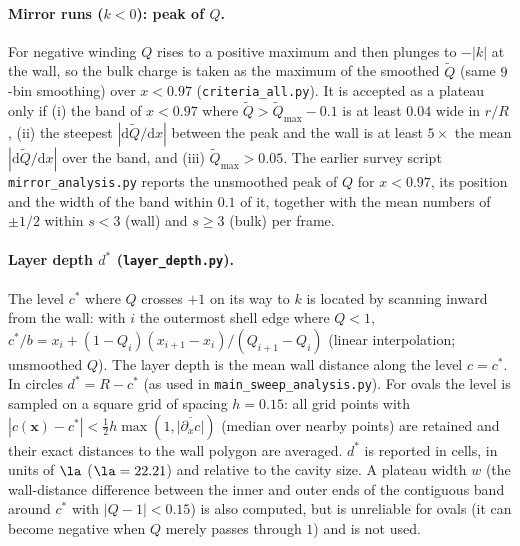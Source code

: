 \paragraph{Mirror runs ($k<0$): peak of $Q$.}
For negative winding $Q$ rises to a positive maximum and then plunges to $-|k|$ at the wall, so the
bulk charge is taken as the maximum of the smoothed $\tilde Q$ (same $9$-bin smoothing) over
$x<0.97$ (\texttt{criteria\_all.py}). It is accepted as a plateau only if (i) the band of $x<0.97$
where $\tilde Q>\tilde Q_{\max}-0.1$ is at least $0.04$ wide in $r/R$, (ii) the steepest
$|\mathrm{d}\tilde Q/\mathrm{d}x|$ between the peak and the wall is at least $5\times$ the mean
$|\mathrm{d}\tilde Q/\mathrm{d}x|$ over the band, and (iii) $\tilde Q_{\max}>0.05$. The earlier survey
script \texttt{mirror\_analysis.py} reports the unsmoothed peak of $Q$ for $x<0.97$, its position and
the width of the band within $0.1$ of it, together with the mean numbers of $\pm1/2$ within $s<3$
(wall) and $s\ge3$ (bulk) per frame.

\paragraph{Layer depth $d^*$ (\texttt{layer\_depth.py}).}
\label{sec:methods-dstar}
The level $c^*$ where $Q$ crosses $+1$ on its way to $k$ is located by scanning inward from the
wall: with $i$ the outermost shell edge where $Q<1$,
$c^*/b = x_i + (1-Q_i)(x_{i+1}-x_i)/(Q_{i+1}-Q_i)$ (linear interpolation; unsmoothed $Q$).
The layer depth is the mean wall distance along the level $c=c^*$. In circles $d^*=R-c^*$
(as used in \texttt{main\_sweep\_analysis.py}). For ovals the level is sampled on a square grid of
spacing $h=0.15$: all grid points with $|c(\mathbf{x})-c^*|<\tfrac12 h\max(1,\overline{|\partial_x c|})$
(median over nearby points) are retained and their exact distances to the wall polygon are averaged.
$d^*$ is reported in cells, in units of $\la$ ($\la=22.21$) and relative to the cavity size.
A plateau width $w$ (the wall-distance difference between the inner and outer ends of the contiguous
band around $c^*$ with $|Q-1|<0.15$) is also computed, but is unreliable for ovals (it can become
negative when $Q$ merely passes through $1$) and is not used.

